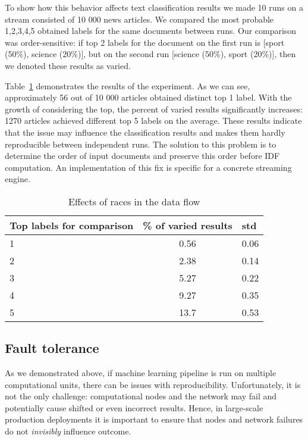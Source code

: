 To show how this behavior affects text classification results we made 10 runs on a stream consisted of 10 000 news articles. We compared the most probable 1,2,3,4,5 obtained labels for the same documents between runs. Our comparison was order-sensitive: if top 2 labels for the document on the first run is [sport (50\%), science (20\%)], but on the second run [science (50\%), sport (20\%)], then we denoted these results as varied. 

Table~\ref{race_table} demonstrates the results of the experiment. As we can see, approximately 56 out of 10 000 articles obtained distinct top 1 label. With the growth of considering the top, the percent of varied results significantly increases: 1270 articles achieved different top 5 labels on the average. These results indicate that the issue may influence the classification results and makes them hardly reproducible between independent runs. The solution to this problem is to determine the order of input documents and preserve this order before IDF computation. An implementation of this fix is specific for a concrete streaming engine.

\begin{table}[htbp]
\caption{Effects of races in the data flow}
\begin{threeparttable}
\begin{tabular}{lcl}
Top labels for comparison    & \% of varied results & std    \\
\hline
1   &   0.56    &   0.06    \\
2   &   2.38    &   0.14    \\
3   &   5.27    &   0.22    \\
4   &   9.27    &   0.35    \\
5   &   13.7    &   0.53    \\
\end{tabular}
\end{threeparttable}
\label{race_table}
\end{table}

\subsection{Fault tolerance}

As we demonstrated above, if machine learning pipeline is run on multiple computational units, there can be issues with reproducibility. Unfortunately, it is not the only challenge: computational nodes and the network may fail and potentially cause shifted or even incorrect results. Hence, in large-scale production deployments it is important to ensure that nodes and network failures do not {\em invisibly} influence outcome.


